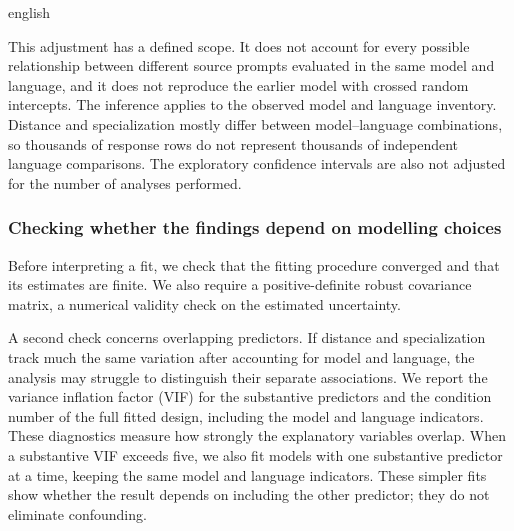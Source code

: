 \begin{otherlanguage*}{english}

This adjustment has a defined scope. It does not account for every possible relationship between different source prompts evaluated in the same model and language, and it does not reproduce the earlier model with crossed random intercepts. The inference applies to the observed model and language inventory. Distance and specialization mostly differ between model--language combinations, so thousands of response rows do not represent thousands of independent language comparisons. The exploratory confidence intervals are also not adjusted for the number of analyses performed.


\subsubsection{Checking whether the findings depend on modelling choices}

Before interpreting a fit, we check that the fitting procedure converged and that its estimates are finite. We also require a positive-definite robust covariance matrix, a numerical validity check on the estimated uncertainty.


A second check concerns overlapping predictors. If distance and specialization track much the same variation after accounting for model and language, the analysis may struggle to distinguish their separate associations. We report the variance inflation factor (VIF) for the substantive predictors and the condition number of the full fitted design, including the model and language indicators. These diagnostics measure how strongly the explanatory variables overlap. When a substantive VIF exceeds five, we also fit models with one substantive predictor at a time, keeping the same model and language indicators. These simpler fits show whether the result depends on including the other predictor; they do not eliminate confounding.


\end{otherlanguage*}
